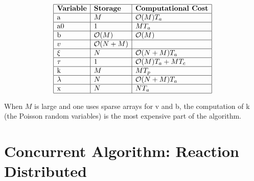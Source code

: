 \documentclass[letterpaper]{article}
\begin{document}
\begin{table}[h]
\[
\begin{array}{|l|l|l|}
\hline %
\text{\bf{Variable}} & \text{\bf{Storage}} & \text{\bf{Computational Cost}} \\
\hline %
\text{a} &
M &
\mathcal{O}(M) T_a\\
\hline %
\text{a0} & 
1 &
M T_a \\
\hline %
\text{b} &
\mathcal{O}(M) &
\mathcal{O}(M) \\
\hline %
v &
\mathcal{O}(N + M) &
 \\
\hline %
\xi &
N &
\mathcal{O}(N + M) T_a \\
\hline %
\tau & 
1 &
\mathcal{O}(M) T_a + M T_c \\
\hline %
\text{k} & 
M &
M T_p \\
\hline %
\lambda & 
N &
\mathcal{O}(N + M) T_a \\
\hline %
\text{x} & 
N &
N T_a \\
\hline %
\end{array}
\]
\caption{Computational complexity for one step in the sequential algorithm for
	the basic $\tau$-leap method using sparse arrays.}
\label{sequentialComplexitySparse}
\end{table}


When $M$ is large and one uses sparse arrays for v and b, the computation
of k (the Poisson random variables) is the most expensive part of the 
algorithm.








\section{Concurrent Algorithm: Reaction Distributed}
\end{document}
